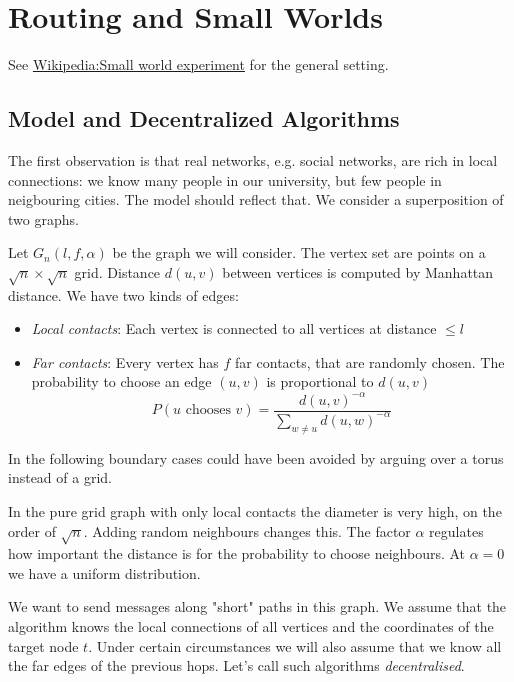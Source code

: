 \section{Routing and Small Worlds}

See \href{http://en.wikipedia.org/wiki/Small_world_experiment}{Wikipedia:Small world experiment} for the general setting.

\subsection{Model and Decentralized Algorithms}

The first observation is that real networks, e.g. social networks, are rich in local connections: we know many people in our university, but few people in neigbouring cities. The model should reflect that. We consider a superposition of two graphs.

Let $G_n(l,f,\alpha)$ be the graph we will consider. The vertex set are points on a $\sqrt{n}\times \sqrt{n}$ grid. Distance $d(u,v)$ between vertices is computed by Manhattan distance. We have two kinds of edges:

\begin{itemize}
\item \emph{Local contacts}: Each vertex is connected to all vertices at distance $\leq l$
\item \emph{Far contacts}: Every vertex has $f$ far contacts, that are randomly chosen. The probability to choose an edge $(u,v)$ is proportional to $d(u,v)$
\[P(\text{$u$ chooses $v$}) = \frac{d(u,v)^{-\alpha}}{\sum_{w\neq u} d(u,w)^{-\alpha}}\]
\end{itemize}

In the following boundary cases could have been avoided by arguing over a torus instead of a grid.

In the pure grid graph with only local contacts the diameter is very high, on the order of $\sqrt n$. Adding random neighbours changes this. The factor $\alpha$ regulates how important the distance is for the probability to choose neighbours. At $\alpha=0$ we have a uniform distribution.

We want to send messages along "short" paths in this graph. We assume that the algorithm knows the local connections of all vertices and the coordinates of the target node $t$. Under certain circumstances we will also assume that we know all the far edges of the previous hops. Let's call such algorithms \emph{decentralised}.

